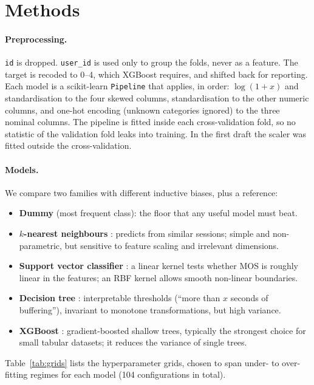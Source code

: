 \documentclass[11pt,a4paper]{article}
\newcommand{\code}[1]{\texttt{#1}}
\begin{document}
\section{Methods}
\paragraph{Preprocessing.}
\code{id} is dropped. \code{user\_id} is used only to group the folds, never as a feature. The target is
recoded to 0--4, which XGBoost requires, and shifted back for reporting. Each model is a scikit-learn
\citep{pedregosa2011sklearn} \code{Pipeline} that applies, in order: $\log(1+x)$ and standardisation to the
four skewed columns, standardisation to the other numeric columns, and one-hot encoding (unknown categories
ignored) to the three nominal columns. The pipeline is fitted inside each cross-validation fold, so no
statistic of the validation fold leaks into training. In the first draft the scaler was fitted outside the
cross-validation.

\paragraph{Models.}
We compare two families with different inductive biases, plus a reference:
\begin{itemize}
  \item \textbf{Dummy} (most frequent class): the floor that any useful model must beat.
  \item \textbf{$k$-nearest neighbours} \citep{cover1967knn}: predicts from similar sessions; simple and
        non-parametric, but sensitive to feature scaling and irrelevant dimensions.
  \item \textbf{Support vector classifier} \citep{cortes1995svm}: a linear kernel tests whether MOS is
        roughly linear in the features; an RBF kernel allows smooth non-linear boundaries.
  \item \textbf{Decision tree} \citep{breiman1984cart}: interpretable thresholds (``more than $x$
        seconds of buffering''), invariant to monotone transformations, but high variance.
  \item \textbf{XGBoost} \citep{chen2016xgboost}: gradient-boosted shallow trees, typically the strongest
        choice for small tabular datasets; it reduces the variance of single trees.
\end{itemize}
Table~\ref{tab:grids} lists the hyperparameter grids, chosen to span under- to over-fitting regimes for
each model (104 configurations in total).
\end{document}
